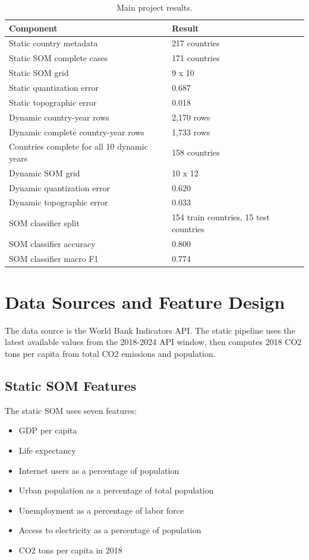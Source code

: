 \documentclass[11pt,a4paper]{article}
\begin{document}
\begin{table}[H]
\centering
\caption{Main project results.}
\begin{tabular}{ll}
\toprule
\textbf{Component} & \textbf{Result} \\
\midrule
Static country metadata & 217 countries \\
Static SOM complete cases & 171 countries \\
Static SOM grid & 9 x 10 \\
Static quantization error & 0.687 \\
Static topographic error & 0.018 \\
Dynamic country-year rows & 2,170 rows \\
Dynamic complete country-year rows & 1,733 rows \\
Countries complete for all 10 dynamic years & 158 countries \\
Dynamic SOM grid & 10 x 12 \\
Dynamic quantization error & 0.620 \\
Dynamic topographic error & 0.033 \\
SOM classifier split & 154 train countries, 15 test countries \\
SOM classifier accuracy & 0.800 \\
SOM classifier macro F1 & 0.774 \\
\bottomrule
\end{tabular}
\end{table}

\section{Data Sources and Feature Design}

The data source is the World Bank Indicators API. The static pipeline uses the latest available values from the 2018-2024 API window, then computes 2018 CO2 tons per capita from total CO2 emissions and population.

\subsection{Static SOM Features}

The static SOM uses seven features:

\begin{itemize}
  \item GDP per capita
  \item Life expectancy
  \item Internet users as a percentage of population
  \item Urban population as a percentage of total population
  \item Unemployment as a percentage of labor force
  \item Access to electricity as a percentage of population
  \item CO2 tons per capita in 2018
\end{itemize}
\end{document}
